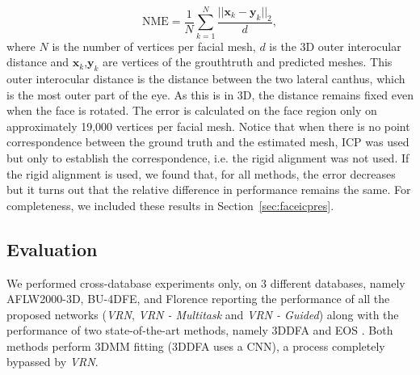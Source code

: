 \begin{equation}
  \textrm{NME} = \frac{1}{N} \sum_{k=1}^{N} \frac{||\mathbf{x}_k-\mathbf{y}_{k} ||_{2} }{d}, \label{eq:err}
\end{equation}
\label{eq:3d_nme}
where $N$ is the number of vertices per facial mesh, $d$ is the 3D
outer interocular distance and $\mathbf{x}_k$,$\mathbf{y}_k$ are
vertices of the grouthtruth and predicted meshes. This outer
interocular distance is the distance between the two lateral canthus,
which is the most outer part of the eye. As this is in 3D, the
distance remains fixed even when the face is rotated. The error is
calculated on the face region only on approximately 19,000 vertices
per facial mesh. Notice that when there is no point correspondence
between the ground truth and the estimated mesh, ICP was used but only
to establish the correspondence, i.e. the rigid alignment was not
used. If the rigid alignment is used, we found that, for all methods,
the error decreases but it turns out that the relative difference in
performance remains the same. For completeness, we included these
results in Section~\ref{sec:faceicpres}.


\subsection{Evaluation}

We performed cross-database experiments only, on 3 different
databases, namely AFLW2000-3D, BU-4DFE, and Florence reporting the
performance of all the proposed networks (\textit{VRN}, \textit{VRN -
  Multitask} and \textit{VRN - Guided}) along with the performance of
two state-of-the-art methods, namely 3DDFA \cite{zhu2016face} and EOS
\cite{huber2016multiresolution}. Both methods perform 3DMM
fitting (3DDFA uses a CNN), a process completely bypassed by \textit{VRN}.



